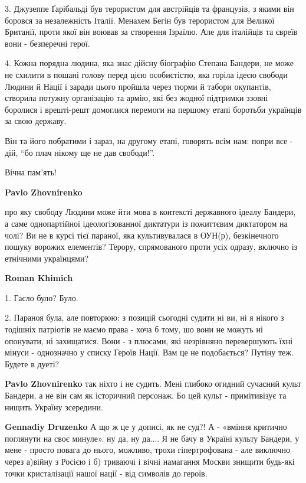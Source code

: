 \begin{itemize}
3. Джузеппе Ґарібальді був терористом для австрійців та французів, з якими він
боровся за незалежність Італії. Менахем Бегін був терористом для Великої
Британії, проти якої він воював за створення Ізраїлю. Але для італійців та
євреїв вони - безперечні герої.

4. Кожна порядна людина, яка знає дійсну біографію Степана Бандери, не може не
схилити в пошані голову перед цією особистістю, яка горіла ідеєю свободи Людини
й Нації і заради цього пройшла через тюрми й табори окупантів, створила потужну
організацію та армію, які без жодної підтримки ззовні боролися і врешті-решт
домоглися перемоги на першому етапі боротьби українців за свою державу.

Він та його побратими і зараз, на другому етапі, говорять всім нам: попри все -
дій, \enquote{бо плач нікому ще не дав свободи!}.

Вічна пам'ять!

\begin{itemize} %
\textbf{Pavlo Zhovnirenko} 

про яку свободу Людини може йти мова в контексті державного ідеалу Бандери, а
саме однопартійної ідеологізованної диктатури із пожиттєвим диктатором на чолі?
Ви не в курсі тієї параної, яка культивувалася в ОУН(р), безкінечного пошуку
ворожих елементів? Терору, спрямованого проти усіх одразу, включно із етнічними
українцями?


\textbf{Roman Khimich} 

1. Гасло було? Було.

2. Параноя була, але повторюю: з позицій сьогодні судити ні ви, ні я нікого з
тодішніх патріотів не маємо права - хоча б тому, шо вони не можуть ні
опонувати, ні захищатися. Вони - з плюсами, які незрівняно перевершують їхні
мінуси - однозначно у списку Героїв Нації. Вам це не подобається? Путіну теж.
Будете в дуеті?

\textbf{Pavlo Zhovnirenko} так ніхто і не судить. Мені глибоко огидний сучасний культ Бандери, а не він сам як історичний персонаж. Бо цей культ - примітивізує та нищить Україну зсередини.

\textbf{Gennadiy Druzenko} А що ж це у дописі, як не суд?! А - «вміння критично поглянути на своє минуле». ну да, ну да....
Я не бачу в Україні культу Бандери, у мене - просто повага до нього, можливо, трохи гіпертрофована - але виключно через а)війну з Росією і б) триваючі і вічні намагання Москви знищити будь-які точки кристалізації нашої нації - від символів до героїв.


\end{itemize}
\end{itemize}
